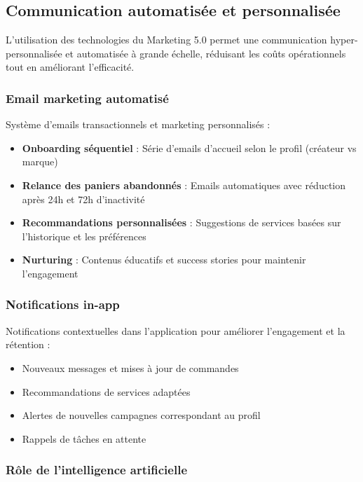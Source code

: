 \subsection{Communication automatisée et personnalisée}

L'utilisation des technologies du Marketing 5.0 permet une communication hyper-personnalisée et automatisée à grande échelle, réduisant les coûts opérationnels tout en améliorant l'efficacité.

\subsubsection{Email marketing automatisé}

Système d'emails transactionnels et marketing personnalisés :

\begin{itemize}
    \item \textbf{Onboarding séquentiel} : Série d'emails d'accueil selon le profil (créateur vs marque)
    \item \textbf{Relance des paniers abandonnés} : Emails automatiques avec réduction après 24h et 72h d'inactivité
    \item \textbf{Recommandations personnalisées} : Suggestions de services basées sur l'historique et les préférences
    \item \textbf{Nurturing} : Contenus éducatifs et success stories pour maintenir l'engagement
\end{itemize}

\subsubsection{Notifications in-app}

Notifications contextuelles dans l'application pour améliorer l'engagement et la rétention :

\begin{itemize}
    \item Nouveaux messages et mises à jour de commandes
    \item Recommandations de services adaptées
    \item Alertes de nouvelles campagnes correspondant au profil
    \item Rappels de tâches en attente
\end{itemize}

\subsubsection{Rôle de l'intelligence artificielle}

